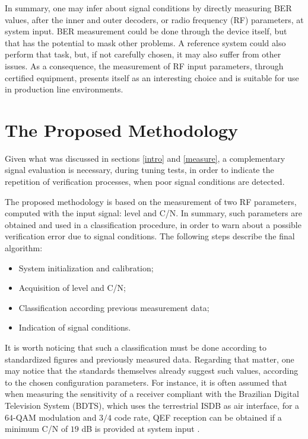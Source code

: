 \documentclass[conference]{IEEEtran}
\begin{document}
In summary, one may infer about signal conditions by directly measuring BER values, after the inner and outer decoders, or radio frequency (RF) parameters, at system input. BER measurement could be done through the device itself, but that has the potential to mask other problems. A reference system could also perform that task, but, if not carefully chosen, it may also suffer from other issues. As a consequence, the measurement of RF input parameters, through certified equipment, presents itself as an interesting choice and is suitable for use in production line environments.

\section{The Proposed Methodology}\label{metho}
Given what was discussed in sections \ref{intro} and \ref{measure}, a complementary signal evaluation is necessary, during tuning tests, in order to indicate the repetition of verification processes, when poor signal conditions are detected. 

The proposed methodology is based on the measurement of two RF parameters, computed with the input signal: level and C/N. In summary, such parameters are obtained and used in a classification procedure, in order to warn about a possible verification error due to signal conditions. The following steps describe the final algorithm:

\begin{itemize}
	\item System initialization and calibration;
	\item Acquisition of level and C/N;
	\item Classification according previous measurement data;
	\item Indication of signal conditions.
\end{itemize}

It is worth noticing that such a classification must be done according to standardized figures and previously measured data. Regarding that matter, one may notice that the standards themselves already suggest such values, according to the chosen configuration parameters. For instance, it is often assumed that when measuring the sensitivity of a receiver compliant with the Brazilian Digital Television System (BDTS), which uses the terrestrial ISDB as air interface, for a $64$-QAM modulation and $3/4$ code rate, QEF reception can be obtained if a minimum C/N of $19$ dB is provided at system input \cite{sbtvd}. 
\end{document}

